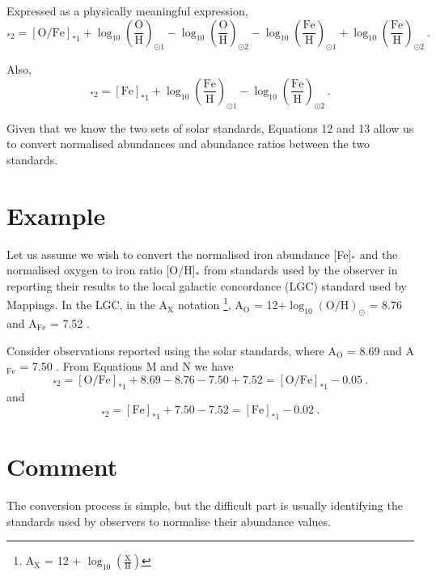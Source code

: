Expressed as a physically meaningful expression,
\begin{equation}
[\text{O}/\text{Fe}]_{*2} = [\text{O}/\text{Fe}]_{*1} + \log_{10}\left(\frac{\text{O}}{\text{H}}\right)_{\odot 1} - \log_{10}\left(\frac{\text{O}}{\text{H}}\right)_{\odot 2} - \log_{10}\left(\frac{\text{Fe}}{\text{H}}\right)_{\odot 1} + \log_{10}\left(\frac{\text{Fe}}{\text{H}}\right)_{\odot 2} \ .
\end{equation}

Also,
\begin{equation}
[\text{Fe}]_{*2} = [\text{Fe}]_{*1} + \log_{10}\left(\frac{\text{Fe}}{\text{H}}\right)_{\odot 1} - \log_{10}\left(\frac{\text{Fe}}{\text{H}}\right)_{\odot 2} \ .
\end{equation}

Given that we know the two sets of solar standards, Equations 12 and 13 allow us to convert normalised abundances and abundance ratios between the two standards.

\section{Example}
Let us assume we wish to convert the normalised iron abundance [Fe]$_*$ and the normalised oxygen to iron ratio [O/H]$_*$ from standards used by the observer in reporting their results to the local galactic concordance (LGC) standard used by Mappings.  In the LGC, in the A$_\text{X}$ notation \footnote{ A$_\text{X}$ = 12 + $\log_{10}(\frac{\text{X}}{\text{H}})$ }, A$_\text{O}$ = 12+$\log_{10}(\text{O/H})_\odot$ = 8.76 and A$_\text{Fe}$ = 7.52 .

Consider observations reported using the \cite{2009ARA&A..47..481A} solar standards, where A$_\text{O}$ = 8.69 and A$_\text{Fe}$ = 7.50 . From Equations M and N we have
\begin{equation}
[\text{O}/\text{Fe}]_{*2} = [\text{O}/\text{Fe}]_{*1} + 8.69 - 8.76 - 7.50 + 7.52 = [\text{O}/\text{Fe}]_{*1} -0.05 \ .
\end{equation}
and
\begin{equation}
[\text{Fe}]_{*2} = [\text{Fe}]_{*1} + 7.50 - 7.52 = [\text{Fe}]_{*1} - 0.02 \ .
\end{equation}

\section{Comment}
The conversion process is simple, but the difficult part is usually identifying the standards used by observers to normalise their abundance values.

  
  
  
  
  
  
  
  